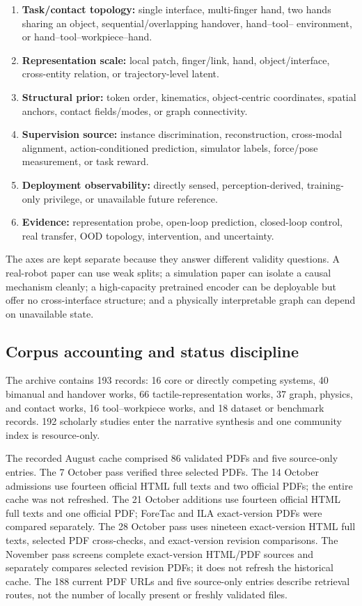 \begin{enumerate}
  \item \textbf{Task/contact topology:} single interface, multi-finger hand,
  two hands sharing an object, sequential/overlapping handover, hand--tool--
  environment, or hand--tool--workpiece--hand.
  \item \textbf{Representation scale:} local patch, finger/link, hand,
  object/interface, cross-entity relation, or trajectory-level latent.
  \item \textbf{Structural prior:} token order, kinematics, object-centric
  coordinates, spatial anchors, contact fields/modes, or graph connectivity.
  \item \textbf{Supervision source:} instance discrimination, reconstruction,
  cross-modal alignment, action-conditioned prediction, simulator labels,
  force/pose measurement, or task reward.
  \item \textbf{Deployment observability:} directly sensed, perception-derived,
  training-only privilege, or unavailable future reference.
  \item \textbf{Evidence:} representation probe, open-loop prediction,
  closed-loop control, real transfer, OOD topology, intervention, and uncertainty.
\end{enumerate}

The axes are kept separate because they answer different validity questions.
A real-robot paper can use weak splits; a simulation paper can isolate a causal
mechanism cleanly; a high-capacity pretrained encoder can be deployable but offer
no cross-interface structure; and a physically interpretable graph can depend on
unavailable state.

\subsection{Corpus accounting and status discipline}

The archive contains 193 records: 16 core or directly competing systems,
40 bimanual and handover works, 66 tactile-representation works,
37 graph, physics, and contact works, 16 tool--workpiece works, and
18 dataset or benchmark records. 192 scholarly studies enter the
narrative synthesis and one community index is resource-only.

The recorded August cache comprised 86 validated PDFs and five source-only
entries. The 7 October pass verified three selected PDFs. The 14 October
admissions use fourteen official HTML full texts and two official PDFs; the entire cache
was not refreshed. The 21 October additions use fourteen official HTML full
texts and one official PDF; ForeTac and ILA exact-version PDFs were compared
separately. The 28 October pass uses nineteen exact-version HTML full texts,
selected PDF cross-checks, and exact-version revision comparisons.
The November pass screens complete exact-version HTML/PDF sources and separately
compares selected revision PDFs; it does not refresh the historical cache.
The 188 current PDF URLs and five source-only entries describe retrieval routes,
not the number of locally present or freshly validated files.

